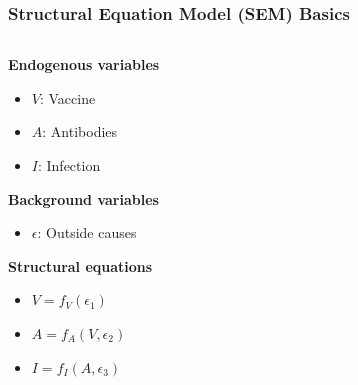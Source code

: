 \documentclass[12pt, block=fill]{beamer}
\begin{document}
\begin{frame}
  \frametitle{Structural Equation Model (SEM) Basics}
   
  \begin{columns}
    \begin{column}{0.6\textwidth}
      \textbf{Endogenous variables}
      \begin{itemize}
      \item $V$: Vaccine
      \item $A$: Antibodies
      \item $I$: Infection
      \end{itemize}

      \textbf{Background variables}
      \begin{itemize}
      \item $\epsilon$: Outside causes
      \end{itemize}
   
      \textbf{Structural equations}
      \begin{itemize}
      \item $V = f_V(\epsilon_1)$
      \item $A = f_A(V, \epsilon_2)$
      \item $I = f_I(A, \epsilon_3)$
      \end{itemize}      
    \end{column}


\end{columns}
\end{frame}
\end{document}
